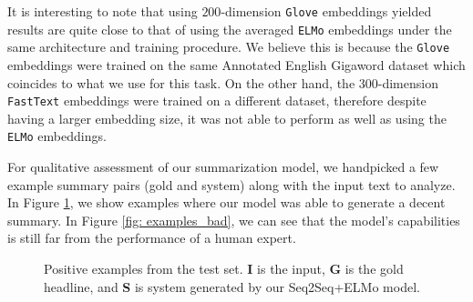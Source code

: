 It is interesting to note that using $200$-dimension \texttt{Glove} embeddings yielded results are quite close to that of using the averaged \texttt{ELMo} embeddings under the same architecture and training procedure. We believe this is because the \texttt{Glove} embeddings were trained on the same Annotated English Gigaword dataset which coincides to what we use for this task. On the other hand, the $300$-dimension \texttt{FastText} embeddings were trained on a different dataset, therefore despite having a larger embedding size, it was not able to perform as well as using the \texttt{ELMo} embeddings.

For qualitative assessment of our summarization model, we handpicked a few example summary pairs (gold and system) along with the input text to analyze. In Figure \ref{fig: examples_good}, we show examples where our model was able to generate a decent summary.  In Figure \ref{fig: examples_bad}, we can see that the model's capabilities is still far from the performance of a human expert. 


\begin{figure}[ht]
\caption{Positive examples from the test set. \textbf{I} is the input, \textbf{G} is the gold headline, and \textbf{S} is system generated by our Seq2Seq+ELMo model.}
\label{fig: examples_good}
\noindent{}
\end{figure}



